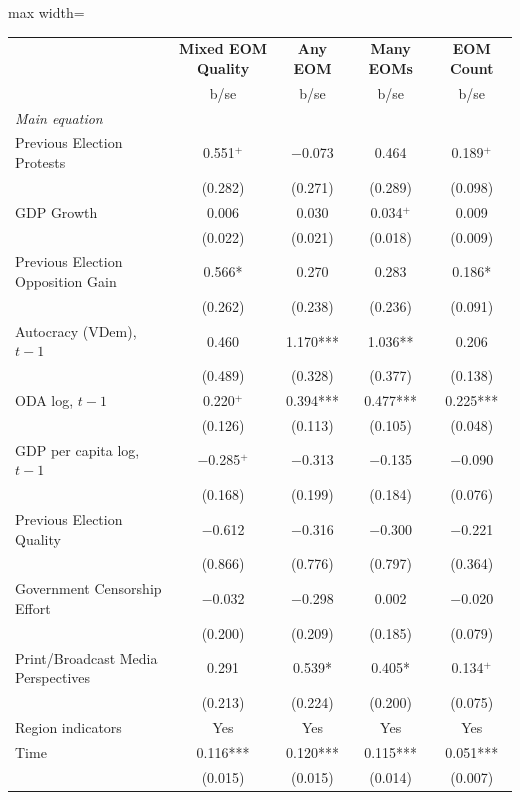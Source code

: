 \documentclass[USletter,12pt, titlepage]{article} %
\begin{document}
\begin{table}[H]
\centering
\begin{adjustbox}{max width=\textwidth}
\begin{threeparttable}
\begin{tabular}{lcccc}
\toprule
 & \textbf{Mixed EOM Quality} & \textbf{Any EOM} & \textbf{Many EOMs} & \textbf{EOM Count} \\
 & b/se & b/se & b/se & b/se \\
\midrule
\multicolumn{5}{l}{\textit{Main equation}} \\
\midrule
Previous Election Protests & 0.551$^{+}$ & $-$0.073 & 0.464 & 0.189$^{+}$ \\
 & (0.282) & (0.271) & (0.289) & (0.098) \\
GDP Growth & 0.006 & 0.030 & 0.034$^{+}$ & 0.009 \\
 & (0.022) & (0.021) & (0.018) & (0.009) \\
Previous Election Opposition Gain & 0.566* & 0.270 & 0.283 & 0.186* \\
 & (0.262) & (0.238) & (0.236) & (0.091) \\
Autocracy (VDem), $t-1$ & 0.460 & 1.170*** & 1.036** & 0.206 \\
 & (0.489) & (0.328) & (0.377) & (0.138) \\
ODA log, $t-1$ & 0.220$^{+}$ & 0.394*** & 0.477*** & 0.225*** \\
 & (0.126) & (0.113) & (0.105) & (0.048) \\
GDP per capita log, $t-1$ & $-$0.285$^{+}$ & $-$0.313 & $-$0.135 & $-$0.090 \\
 & (0.168) & (0.199) & (0.184) & (0.076) \\
Previous Election Quality & $-$0.612 & $-$0.316 & $-$0.300 & $-$0.221 \\
 & (0.866) & (0.776) & (0.797) & (0.364) \\
Government Censorship Effort & $-$0.032 & $-$0.298 & 0.002 & $-$0.020 \\
 & (0.200) & (0.209) & (0.185) & (0.079) \\
Print/Broadcast Media Perspectives & 0.291 & 0.539* & 0.405* & 0.134$^{+}$ \\
 & (0.213) & (0.224) & (0.200) & (0.075) \\
Region indicators & Yes & Yes & Yes & Yes \\
Time & 0.116*** & 0.120*** & 0.115*** & 0.051*** \\
 & (0.015) & (0.015) & (0.014) & (0.007) \\

\end{tabular}
\end{threeparttable}
\end{adjustbox}
\end{table}
\end{document}
